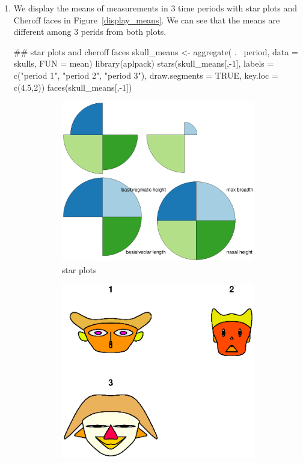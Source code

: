 \documentclass{article}
\begin{document}
\begin{enumerate}[leftmargin = 0 em, label = \arabic*., font = \bfseries]
	\item 
	We display the means of measurements in 3 time periods with star plots and Cheroff faces in Figure~\ref{display_means}. We can see that the means are different among 3 perids from both plots.
	\begin{rcode}
## star plots and cheroff faces
skull_means <- aggregate( .~ period, data = skulls, FUN = mean)
library(aplpack)
stars(skull_means[,-1], labels = c("period 1", "period 2", "period 3"), draw.segments = TRUE, key.loc = c(4.5,2))
faces(skull_means[,-1])
	 \end{rcode} 
	\begin{figure}[!htb]
	    \centering
		\begin{subfigure}[b]{0.5\textwidth}
		\includegraphics[width = \textwidth]{stars.eps}
		\caption{star plots}
		\end{subfigure}%
		\begin{subfigure}[b]{0.5\textwidth}
		\includegraphics[width = \textwidth]{faces.eps}

\end{subfigure}
\end{figure}
\end{enumerate}
\end{document}
